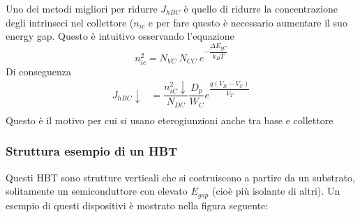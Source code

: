 Uno dei metodi migliori per ridurre $J_{hBC}$ è quello di ridurre la concentrazione degli intrinseci nel collettore ($n_{ic}$ e per fare questo è necessario aumentare il suo energy gap. Questo è intuitivo osservando l'equazione
\begin{equation}
    n_{ic}^2=N_{VC}\ N_{CC}\ e^{-\dfrac{\Delta E_{gC}}{k_BT}}
\end{equation}
Di conseguenza
\begin{align}
    J_{hBC} \downarrow &= \dfrac{n_{iC}^2 \downarrow}{N_{DC}} \dfrac{D_p}{W_C} e^{\dfrac{q(V_B - V_C)}{V_T}}\\
\end{align}
Questo è il motivo per cui si usano eterogiunzioni anche tra base e collettore

%
\subsubsection{Struttura esempio di un HBT}
Questi HBT sono strutture verticali che si costruiscono a partire da un substrato, solitamente un semiconduttore con elevato $E_{gap}$ (cioè più isolante di altri). Un esempio di questi dispositivi è mostrato nella figura seguente:\\

